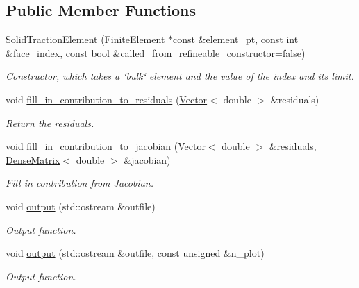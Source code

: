 \subsection*{Public Member Functions}
\begin{DoxyCompactItemize}
\item 
\hyperlink{classoomph_1_1SolidTractionElement_a76c88d0b8ce62fadb73b0b3da315fa05}{Solid\+Traction\+Element} (\hyperlink{classoomph_1_1FiniteElement}{Finite\+Element} $\ast$const \&element\+\_\+pt, const int \&\hyperlink{classoomph_1_1FaceElement_a478d577ac6db67ecc80f1f02ae3ab170}{face\+\_\+index}, const bool \&called\+\_\+from\+\_\+refineable\+\_\+constructor=false)
\begin{DoxyCompactList}\small\item\em Constructor, which takes a \char`\"{}bulk\char`\"{} element and the value of the index and its limit. \end{DoxyCompactList}\item 
void \hyperlink{classoomph_1_1SolidTractionElement_aaa22a21aa54edecac7052f6bcf0867a4}{fill\+\_\+in\+\_\+contribution\+\_\+to\+\_\+residuals} (\hyperlink{classoomph_1_1Vector}{Vector}$<$ double $>$ \&residuals)
\begin{DoxyCompactList}\small\item\em Return the residuals. \end{DoxyCompactList}\item 
void \hyperlink{classoomph_1_1SolidTractionElement_a7f6315287b8d863631a06b75e0cc7daf}{fill\+\_\+in\+\_\+contribution\+\_\+to\+\_\+jacobian} (\hyperlink{classoomph_1_1Vector}{Vector}$<$ double $>$ \&residuals, \hyperlink{classoomph_1_1DenseMatrix}{Dense\+Matrix}$<$ double $>$ \&jacobian)
\begin{DoxyCompactList}\small\item\em Fill in contribution from Jacobian. \end{DoxyCompactList}\item 
void \hyperlink{classoomph_1_1SolidTractionElement_aa5ae857f45de4fed26278e7919089a1d}{output} (std\+::ostream \&outfile)
\begin{DoxyCompactList}\small\item\em Output function. \end{DoxyCompactList}\item 
void \hyperlink{classoomph_1_1SolidTractionElement_a13a5bbe49c2d7ad5079e3354a34f248e}{output} (std\+::ostream \&outfile, const unsigned \&n\+\_\+plot)
\begin{DoxyCompactList}\small\item\em Output function. \end{DoxyCompactList}\item 

\end{DoxyCompactItemize}
